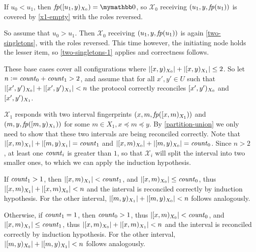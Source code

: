 \begin{caselist}
\begin{caselist}
\case \label{two-singletons-1}  If $u_0 < u_1$, then $\fp{\interval{u_1}{y}{X_0}} = \neutraladd$, so $\mathcal{X}_0$ receiving $({u_1}, {y}, {\mathit{fp}(u_1)})$ is covered by \cref{x1-empty} with the roles reversed.

\case \label{two-singletons-2} So assume that $u_0 > u_1$. Then $\mathcal{X}_0$ receiving $({u_1}, {y}, {\mathit{fp}(u_1)})$ is again \cref{two-singletons}, with the roles reversed. This time however, the initiating node holds the lesser item, so \cref{two-singletons-1} applies and correctness follows.
\end{caselist}
\end{caselist}

These base cases cover all configurations where $|{[{x},{y})_{X_0}}| + |{[{x},{y})_{X_1}}| \leq 2$.
So let $n \vcentcolon= \mathit{count}_{0} + \mathit{count}_{1} > 2$, and assume that for all $x', y' \in U$ such that $|{[{x'},{y'})_{X_0}}| + |{[{x'},{y'})_{X_1}}| < n$ the protocol correctly reconciles $[{x'},{y'})_{X_0}$ and $[{x'},{y'})_{X_1}$.

$\mathcal{X}_1$ responds with two interval fingerprints $({x}, {m}, {\mathit{fp}([{x},{m})_{X_1})})$ and $({m}, {y}, {\mathit{fp}([{m},{y})_{X_1})})$ for some $m \in X_1, x \preceq m \preceq y$.
By \cref{partition-union} we only need to show that these two intervals are being reconciled correctly.
Note that $|{[{x},{m})_{X_1}}| + |{[{m},{y})_{X_1}}| = \mathit{count}_{1}$ and $|{[{x},{m})_{X_0}}| + |{[{m},{y})_{X_0}}| = \mathit{count}_{0}$. Since $n > 2$, at least one $\mathit{count}_{i}$ is greater than $1$, so that $\mathcal{X}_i$ will split the interval into two smaller ones, to which we can apply the induction hypothesis.

\begin{caselist}
\case If $\mathit{count}_{1} > 1$, then $|{[{x},{m})_{X_1}}| < \mathit{count}_{1}$, and $|{[{x},{m})_{X_0}}| \leq \mathit{count}_{0}$, thus $|{[{x},{m})_{X_1}}| + |{[{x},{m})_{X_0}}| < n$ and the interval is reconciled correctly by induction hypothesis. For the other interval, $|{[{m},{y})_{X_1}}| + |{[{m},{y})_{X_0}}| < n$ follows analogously.

\case Otherwise, if $\mathit{count}_{1} = 1$, then $\mathit{count}_{0} > 1$, thus $|{[{x},{m})_{X_0}}| < \mathit{count}_{0}$, and $|{[{x},{m})_{X_1}}| \leq \mathit{count}_{1}$, thus $|{[{x},{m})_{X_0}}| + |{[{x},{m})_{X_1}}| < n$ and the interval is reconciled correctly by induction hypothesis. For the other interval, $|{[{m},{y})_{X_0}}| + |{[{m},{y})_{X_1}}| < n$ follows analogously.
\end{caselist}

